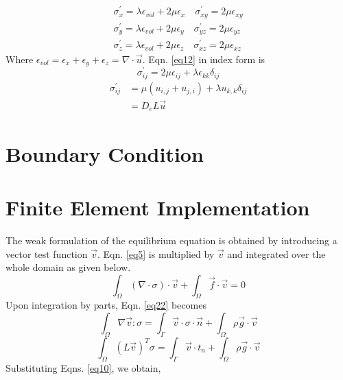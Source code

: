 \documentclass[12pt]{article}
\begin{document}
%
\begin{equation}		\label{eq12}
\begin{split}
\sigma^{\prime}_x=\lambda \epsilon_{vol} + 2\mu\epsilon_x \quad \sigma^{\prime}_{xy}= 2\mu\epsilon_{xy} \\
 \sigma^{\prime}_y= \lambda\epsilon_{vol} + 2\mu\epsilon_y \quad \sigma^{\prime}_{yz}= 2\mu\epsilon_{yz}	\\
\sigma^{\prime}_z= \lambda\epsilon_{vol} + 2\mu\epsilon_z \quad \sigma^{\prime}_{xz}= 2\mu\epsilon_{xz}	
\end{split}
\end{equation}
%
Where $\epsilon_{vol} = \epsilon_x+\epsilon_y+\epsilon_z=\nabla\cdot\vec{u}$. Eqn. \ref{eq12} in index form is
%
\begin{equation}	\label{eq13}
\sigma_{ij}^{\prime}=2\mu\epsilon_{ij}+\lambda\epsilon_{kk}\delta_{ij}
\end{equation}
%
\begin{equation}	\label{eq14}
\begin{split}
\sigma^{\prime}_{ij}&=\mu(u_{i,j} + u_{j,i})+\lambda u_{k,k}\delta_{ij}	\\
&=D_eL\vec{u}
\end{split}
\end{equation}
%
\section{Boundary Condition}
\section{Finite Element Implementation}
The weak formulation of the equilibrium equation is obtained by introducing a vector test function $\vec{v}$. Eqn. \ref{eq5} is multiplied by $\vec{v}$ and integrated over the whole domain as given below.
%
\begin{equation}	\label{eq22}
\int_\Omega(\nabla\cdot\sigma)\cdot\vec{v}+\int_\Omega\vec{f}\cdot\vec{v}=0
\end{equation}
\newline
Upon integration by parts, Eqn. \ref{eq22} becomes
%
\begin{equation}	\label{eq23}
\int_\Omega\nabla \vec{v}:\sigma=\int_\Gamma\vec{v}\cdot\sigma\cdot\vec{n}+\int_\Omega\rho\vec{g}\cdot\vec{v}
\end{equation}
%
\begin{equation}	\label{eq24}
\int_\Omega(L\vec{v})^T\sigma=\int_\Gamma\vec{v}\cdot t_n+\int_\Omega\rho\vec{g}\cdot\vec{v}
\end{equation}
%
Substituting Eqns. \ref{eq10}, we obtain,
\end{document}
